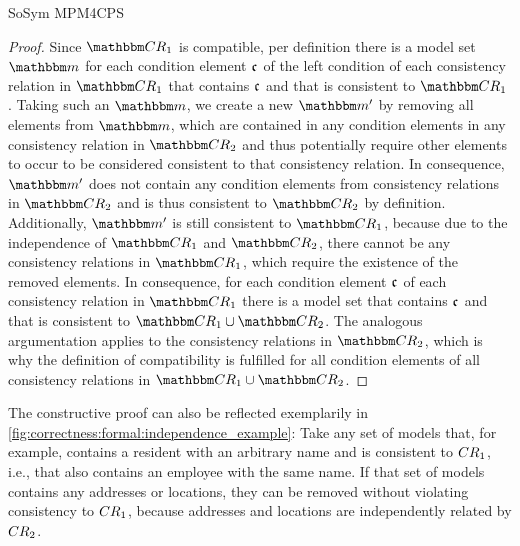 \begin{copiedFrom}{SoSym MPM4CPS}
\begin{proof}
    Since $\consistencyrelationset{CR}_{1}$ is compatible, per definition there is a model set $\modelset{m}$ for each condition element $\mathfrak{c}_{}$ of the left condition of each consistency relation in $\consistencyrelationset{CR}_{1}$ that contains $\mathfrak{c}_{}$ and that is consistent to $\consistencyrelationset{CR}_{1}$.
    Taking such an $\modelset{m}$, we create a new $\modelset{m'}$ by removing all elements from $\modelset{m}$, which are contained in any condition elements in any consistency relation in $\consistencyrelationset{CR}_{2}$ and thus potentially require other elements to occur to be considered consistent to that consistency relation.
    In consequence, $\modelset{m'}$ does not contain any condition elements from consistency relations in $\consistencyrelationset{CR}_{2}$ and is thus consistent to $\consistencyrelationset{CR}_{2}$ by definition. 
    Additionally, $\modelset{m'}$ is still consistent to $\consistencyrelationset{CR}_{1}$, because due to the independence of $\consistencyrelationset{CR}_{1}$ and $\consistencyrelationset{CR}_{2}$, there cannot be any consistency relations in $\consistencyrelationset{CR}_{1}$, which require the existence of the removed elements.
    In consequence, for each condition element $\mathfrak{c}_{}$ of each consistency relation in $\consistencyrelationset{CR}_{1}$ there is a model set that contains $\mathfrak{c}_{}$ and that is consistent to $\consistencyrelationset{CR}_{1} \cup \consistencyrelationset{CR}_{2}$.
    The analogous argumentation applies to the consistency relations in $\consistencyrelationset{CR}_{2}$, which is why the definition of compatibility is fulfilled for all condition elements of all consistency relations in $\consistencyrelationset{CR}_{1} \cup \consistencyrelationset{CR}_{2}$.
\end{proof}

The constructive proof can also be reflected exemplarily in \autoref{fig:correctness:formal:independence_example}: Take any set of models that, for example, contains a resident with an arbitrary name and is consistent to $CR_{1}$, i.e., that also contains an employee with the same name.
If that set of models contains any addresses or locations, they can be removed %
without violating consistency to $CR_{1}$, because addresses and locations are independently related by $CR_{2}$.


\end{copiedFrom}
